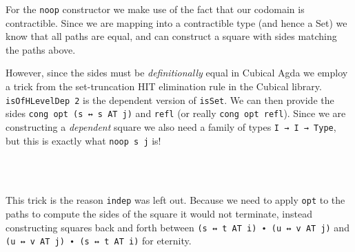 For the \texttt{noop} constructor we make use of the fact that our codomain is
contractible. Since we are mapping into a contractible type (and hence a Set) we know
that all paths are equal, and can construct a square with sides matching the paths above.

However, since the sides must be \emph{definitionally} equal in Cubical Agda we employ
a trick from the set-truncation HIT elimination rule in the Cubical library. \texttt{isOfHLevelDep 2}
is the dependent version of \texttt{isSet}. We can then provide the sides
\texttt{cong opt (s ↔ s AT j)} and \texttt{refl} (or really \texttt{cong opt refl}). Since we are
constructing a \emph{dependent} square we also need a family of types \texttt{I → I → Type}, but this
is exactly what \texttt{noop s j} is!

\begin{code}%
\>[0]\AgdaSpace{}%
\AgdaSymbol{(}\AgdaSpace{}%
\AgdaSpace{}%
\AgdaSpace{}%
\AgdaSpace{}%
\AgdaSymbol{)}\AgdaSpace{}%
\AgdaSymbol{=}\AgdaSpace{}%
\AgdaSpace{}%
\<%
\\
\>[0][@{}l@{\AgdaIndent{0}}]%
\>[2]\AgdaSymbol{(}\AgdaSpace{}%
\AgdaSpace{}%
\AgdaSpace{}%
\AgdaSpace{}%
\AgdaSymbol{)}\<%
\\
%
\>[2]\AgdaSymbol{\AgdaUnderscore{}}\AgdaSpace{}%
\AgdaSymbol{\AgdaUnderscore{}}\AgdaSpace{}%
\AgdaSymbol{(}\AgdaSpace{}%
\AgdaSpace{}%
\AgdaSymbol{(}\AgdaSpace{}%
\AgdaSpace{}%
\AgdaSpace{}%
\AgdaSpace{}%
\AgdaSymbol{))}\AgdaSpace{}%
\AgdaSpace{}%
\AgdaSymbol{(}\AgdaSpace{}%
\AgdaSpace{}%
\AgdaSymbol{)}\AgdaSpace{}%
\AgdaSpace{}%
\<%
\end{code}

This trick is the reason \texttt{indep} was left out. Because we need to apply \texttt{opt} to
the paths to compute the sides of the square it would not terminate, instead constructing squares
back and forth between \texttt{(s ↔ t AT i) ∙ (u ↔ v AT j)} and \texttt{(u ↔ v AT j) ∙ (s ↔ t AT i)}
for eternity.


